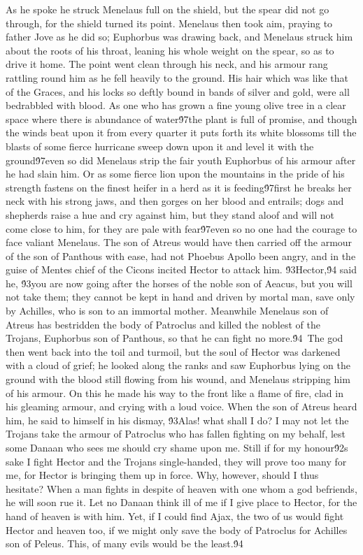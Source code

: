 {As he spoke he struck Menelaus full on the shield, but the spear did not go through, for the shield turned its point. Menelaus then took aim, praying to father Jove as he did so; Euphorbus was drawing back, and Menelaus struck him about the roots of his throat, leaning his whole weight on the spear, so as to drive it home. The point went clean through his neck, and his armour rang rattling round him as he fell heavily to the ground. His hair which was like that of the Graces, and his locks so deftly bound in bands of silver and gold, were all bedrabbled with blood. As one who has grown a fine young olive tree in a clear space where there is abundance of water\'97the plant is full of promise, and though the winds beat upon it from every quarter it puts forth its white blossoms till the blasts of some fierce hurricane sweep down upon it and level it with the ground\'97even so did Menelaus strip the fair youth Euphorbus of his armour after he had slain him. Or as some fierce lion upon the mountains in the pride of his strength fastens on the finest heifer in a herd as it is feeding\'97first he breaks her neck with his strong jaws, and then gorges on her blood and entrails; dogs and shepherds raise a hue and cry against him, but they stand aloof and will not come close to him, for they are pale with fear\'97even so no one had the courage to face valiant Menelaus. The son of Atreus would have then carried off the armour of the son of Panthous with ease, had not Phoebus Apollo been angry, and in the guise of Mentes chief of the Cicons incited Hector to attack him. \'93Hector,\'94 said he, \'93you are now going after the horses of the noble son of Aeacus, but you will not take them; they cannot be kept in hand and driven by mortal man, save only by Achilles, who is son to an immortal mother. Meanwhile Menelaus son of Atreus has bestridden the body of Patroclus and killed the noblest of the Trojans, Euphorbus son of Panthous, so that he can fight no more.\'94\
The god then went back into the toil and turmoil, but the soul of Hector was darkened with a cloud of grief; he looked along the ranks and saw Euphorbus lying on the ground with the blood still flowing from his wound, and Menelaus stripping him of his armour. On this he made his way to the front like a flame of fire, clad in his gleaming armour, and crying with a loud voice. When the son of Atreus heard him, he said to himself in his dismay, \'93Alas! what shall I do? I may not let the Trojans take the armour of Patroclus who has fallen fighting on my behalf, lest some Danaan who sees me should cry shame upon me. Still if for my honour\'92s sake I fight Hector and the Trojans single-handed, they will prove too many for me, for Hector is bringing them up in force. Why, however, should I thus hesitate? When a man fights in despite of heaven with one whom a god befriends, he will soon rue it. Let no Danaan think ill of me if I give place to Hector, for the hand of heaven is with him. Yet, if I could find Ajax, the two of us would fight Hector and heaven too, if we might only save the body of Patroclus for Achilles son of Peleus. This, of many evils would be the least.\'94\
}
